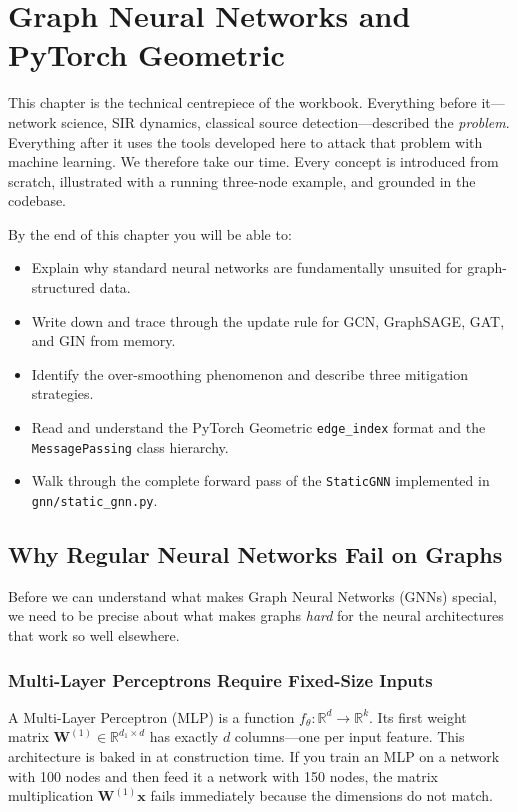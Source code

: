 \chapter{Graph Neural Networks and PyTorch Geometric}

This chapter is the technical centrepiece of the workbook. Everything before it---network science, SIR dynamics, classical source detection---described the \emph{problem}. Everything after it uses the tools developed here to attack that problem with machine learning. We therefore take our time. Every concept is introduced from scratch, illustrated with a running three-node example, and grounded in the codebase.

By the end of this chapter you will be able to:
\begin{itemize}
    \item Explain why standard neural networks are fundamentally unsuited for graph-structured data.
    \item Write down and trace through the update rule for GCN, GraphSAGE, GAT, and GIN from memory.
    \item Identify the over-smoothing phenomenon and describe three mitigation strategies.
    \item Read and understand the PyTorch Geometric \texttt{edge\_index} format and the \texttt{MessagePassing} class hierarchy.
    \item Walk through the complete forward pass of the \texttt{StaticGNN} implemented in \texttt{gnn/static\_gnn.py}.
\end{itemize}

\section{Why Regular Neural Networks Fail on Graphs}

Before we can understand what makes Graph Neural Networks (GNNs) special, we need to be precise about what makes graphs \emph{hard} for the neural architectures that work so well elsewhere.

\subsection{Multi-Layer Perceptrons Require Fixed-Size Inputs}

A Multi-Layer Perceptron (MLP) is a function $f_\theta: \mathbb{R}^d \to \mathbb{R}^k$. Its first weight matrix $\mathbf{W}^{(1)} \in \mathbb{R}^{d_1 \times d}$ has exactly $d$ columns---one per input feature. This architecture is baked in at construction time. If you train an MLP on a network with 100 nodes and then feed it a network with 150 nodes, the matrix multiplication $\mathbf{W}^{(1)}\mathbf{x}$ fails immediately because the dimensions do not match.

